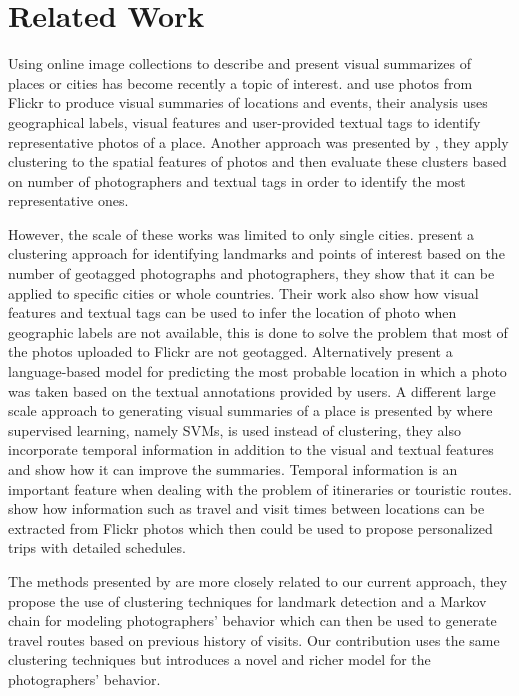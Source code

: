 \chapter{Related Work}
\label{sec:related_work}

Using online image collections to describe and present visual summarizes of places or cities has become recently a topic of interest. \citet{Kennedy2007} and \citet{Kennedy2008} use photos from Flickr to produce visual summaries of locations and events, their analysis uses geographical labels, visual features and user-provided textual tags to identify representative photos of a place. Another approach was presented by \cite{Jaffe2006}, they apply clustering to the spatial features of photos and then evaluate these clusters based on number of photographers and textual tags in order to identify the most representative ones.

However, the scale of these works was limited to only single cities. \cite{Kleinberg2009} present a clustering approach for identifying landmarks and points of interest based on the number of geotagged photographs and photographers, they show that it can be applied to specific cities or whole countries. Their work also show how visual features and textual tags can be used to infer the location of photo when geographic labels are not available, this is done to solve the problem that most of the photos uploaded to Flickr are not geotagged. Alternatively \citet{Serdyukov2009} present a language-based model for predicting the most probable location in which a photo was taken based on the textual annotations provided by users. A different large scale approach to generating visual summaries of a place is presented by \citet{Li2009} where supervised learning, namely SVMs, is used instead of clustering, they also incorporate temporal information in addition to the visual and textual features and show how it can improve the summaries. Temporal information is an important feature when dealing with the problem of itineraries or touristic routes. \citet{Popescu2009} show how information such as travel and visit times between locations can be extracted from Flickr photos which then could be used to propose personalized trips with detailed schedules.

The methods presented by \cite{Kurashima2010} are more closely related to our current approach, they propose the use of clustering techniques for landmark detection and a Markov chain for modeling photographers' behavior which can then be used to generate travel routes based on previous history of visits. Our contribution uses the same clustering techniques but introduces a novel and richer model for the photographers' behavior.

